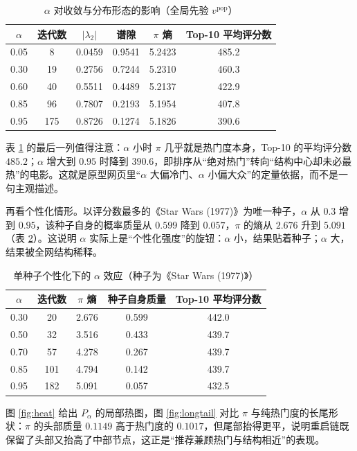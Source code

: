 \documentclass[12pt,a4paper]{ctexart}
\begin{document}
\begin{table}[H]
\centering
\caption{$\alpha$ 对收敛与分布形态的影响（全局先验 $v^{\mathrm{pop}}$）}
\label{tab:alpha}
\small
\begin{tabular}{cccccc}
\toprule
$\alpha$ & 迭代数 & $|\lambda_2|$ & 谱隙 & $\pi$ 熵 & Top-10 平均评分数 \\
\midrule
0.05 & 8   & 0.0459 & 0.9541 & 5.2423 & 485.2 \\
0.30 & 19  & 0.2756 & 0.7244 & 5.2310 & 460.3 \\
0.60 & 40  & 0.5511 & 0.4489 & 5.2137 & 422.9 \\
0.85 & 96  & 0.7807 & 0.2193 & 5.1954 & 407.8 \\
0.95 & 175 & 0.8726 & 0.1274 & 5.1826 & 390.6 \\
\bottomrule
\end{tabular}
\end{table}

表 \ref{tab:alpha} 的最后一列值得注意：$\alpha$ 小时 $\pi$ 几乎就是热门度本身，Top-10 的平均评分数 $485.2$；$\alpha$ 增大到 $0.95$ 时降到 $390.6$，即排序从“绝对热门”转向“结构中心却未必最热”的电影。这就是原型网页里“$\alpha$ 大偏冷门、$\alpha$ 小偏大众”的定量依据，而不是一句主观描述。

再看个性化情形。以评分数最多的《Star Wars (1977)》为唯一种子，$\alpha$ 从 $0.3$ 增到 $0.95$，该种子自身的概率质量从 $0.599$ 降到 $0.057$，$\pi$ 的熵从 $2.676$ 升到 $5.091$（表 \ref{tab:pers}）。这说明 $\alpha$ 实际上是“个性化强度”的旋钮：$\alpha$ 小，结果贴着种子；$\alpha$ 大，结果被全网结构稀释。

\begin{table}[H]
\centering
\caption{单种子个性化下的 $\alpha$ 效应（种子为《Star Wars (1977)》）}
\label{tab:pers}
\small
\begin{tabular}{ccccc}
\toprule
$\alpha$ & 迭代数 & $\pi$ 熵 & 种子自身质量 & Top-10 平均评分数 \\
\midrule
0.30 & 20  & 2.676 & 0.599 & 442.0 \\
0.50 & 32  & 3.516 & 0.433 & 439.7 \\
0.70 & 57  & 4.278 & 0.267 & 439.7 \\
0.85 & 101 & 4.794 & 0.142 & 439.7 \\
0.95 & 182 & 5.091 & 0.057 & 432.5 \\
\bottomrule
\end{tabular}
\end{table}

图 \ref{fig:heat} 给出 $P_{\alpha}$ 的局部热图，图 \ref{fig:longtail} 对比 $\pi$ 与纯热门度的长尾形状：$\pi$ 的头部质量 $0.1149$ 高于热门度的 $0.1017$，但尾部抬得更平，说明重启链既保留了头部又抬高了中部节点，这正是“推荐兼顾热门与结构相近”的表现。
\end{document}
